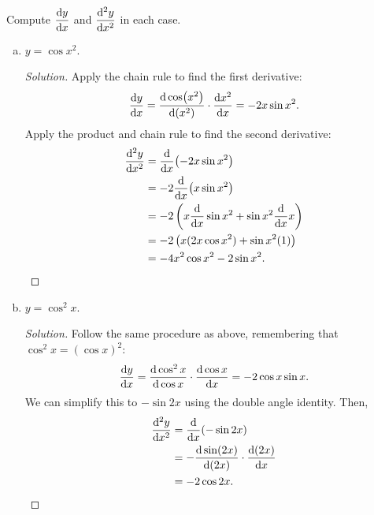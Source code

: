 \documentclass{agony}
\begin{document}
\question Compute $\displaystyle\dv{y}{x}$ and $\displaystyle\dv[2]{y}{x}$ in each case.
\begin{enumerate}[(a)]
  \item $y=\cos x^2$.
        \begin{proof}[Solution]
          Apply the chain rule to find the first derivative:
          \[ \dv{y}{x} = \dv{\cos(x^2)}{(x^2)} \cdot \dv{x^2}{x} = -2x\sin x^2. \]
          Apply the product and chain rule to find the second derivative:
          \begin{align*}
            \dv[2]{y}{x} & = \dv{x}(-2x\sin x^2)                                \\
                         & = -2\dv{x}(x\sin x^2)                                \\
                         & = -2\left( x\dv{x}\sin x^2 + \sin x^2\dv{x}x \right) \\
                         & = -2\left( x(2x\cos x^2) + \sin x^2(1) \right)       \\
                         & = -4x^2\cos x^2 - 2\sin x^2. \qedhere
          \end{align*}
        \end{proof}
  \item $y=\cos^2 x$.
        \begin{proof}[Solution]
          Follow the same procedure as above, remembering that $\cos^2 x = (\cos x)^2$:
          \[ \dv{y}{x} = \dv{\cos^2 x}{\cos x}\cdot\dv{\cos x}{x} = -2\cos x\sin x. \]
          We can simplify this to $-\sin 2x$ using the double angle identity. Then,
          \begin{align*}
            \dv[2]{y}{x} & = \dv{x}(-\sin 2x)                      \\
                         & = -\dv{\sin(2x)}{(2x)}\cdot\dv{(2x)}{x} \\
                         & = -2\cos 2x. \qedhere
          \end{align*}
        \end{proof}
\end{enumerate}
\end{document}

